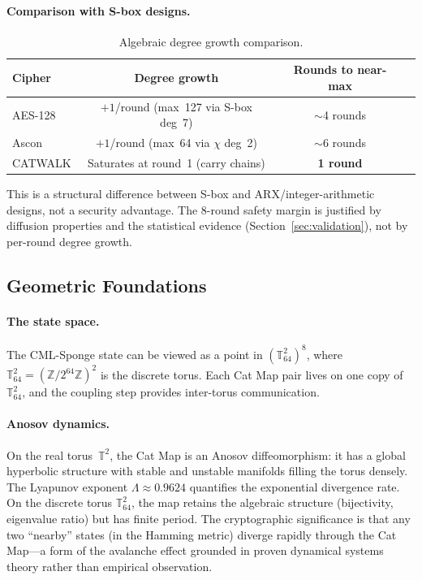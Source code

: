 \documentclass[runningheads]{llncs}
\newcommand{\Ztwo}{\mathbb{Z}/2^{64}\mathbb{Z}}
\begin{document}
\paragraph{Comparison with S-box designs.}
\begin{table}[h]
\centering
\caption{Algebraic degree growth comparison.}
\label{tab:algdeg-compare}
\begin{tabular}{@{}lccc@{}}
\toprule
Cipher & Degree growth & Rounds to near-max \\
\midrule
AES-128 & $+1$/round (max~127 via S-box deg~7) & $\sim$4 rounds \\
Ascon & $+1$/round (max~64 via $\chi$ deg~2) & $\sim$6 rounds \\
CATWALK & Saturates at round~1 (carry chains) & \textbf{1 round} \\
\bottomrule
\end{tabular}
\end{table}

This is a structural difference between S-box and ARX/integer-arithmetic designs, not a
security advantage.  The 8-round safety margin is justified by diffusion properties
and the statistical evidence (Section~\ref{sec:validation}), not by per-round
degree growth.

\subsection{Geometric Foundations}

\paragraph{The state space.}
The CML-Sponge state can be viewed as a point in $(\mathbb{T}^2_{64})^8$,
where $\mathbb{T}^2_{64} = (\Ztwo)^2$ is the discrete torus.  Each Cat Map
pair lives on one copy of~$\mathbb{T}^2_{64}$, and the coupling step
provides inter-torus communication.

\paragraph{Anosov dynamics.}
On the real torus~$\mathbb{T}^2$, the Cat Map is an Anosov diffeomorphism:
it has a global hyperbolic structure with stable and unstable manifolds
filling the torus densely.  The Lyapunov exponent $\Lambda \approx 0.9624$
quantifies the exponential divergence rate.  On the discrete torus $\mathbb{T}^2_{64}$,
the map retains the algebraic structure (bijectivity, eigenvalue ratio) but
has finite period.  The cryptographic significance is that any two
``nearby'' states (in the Hamming metric) diverge rapidly through the
Cat Map---a form of the avalanche effect grounded in proven dynamical
systems theory rather than empirical observation.
\end{document}
